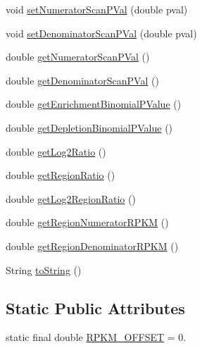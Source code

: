 \begin{DoxyCompactItemize}
void \hyperlink{classumms_1_1core_1_1model_1_1score_1_1_window_all_score_ac9740cfc8bcc63cc0e59c0efc6cde41a}{set\+Numerator\+Scan\+P\+Val} (double pval)
\item 
void \hyperlink{classumms_1_1core_1_1model_1_1score_1_1_window_all_score_ab58a0866736371255e8c3c70c921687e}{set\+Denominator\+Scan\+P\+Val} (double pval)
\item 
double \hyperlink{classumms_1_1core_1_1model_1_1score_1_1_window_all_score_affae49300346f55b174aa8ff6bb32820}{get\+Numerator\+Scan\+P\+Val} ()
\item 
double \hyperlink{classumms_1_1core_1_1model_1_1score_1_1_window_all_score_a8dce98d2a4b85d353527fff26f4f9bf2}{get\+Denominator\+Scan\+P\+Val} ()
\item 
double \hyperlink{classumms_1_1core_1_1model_1_1score_1_1_window_all_score_a6e0eefcb0d6d9a2192030ff5daf093f4}{get\+Enrichment\+Binomial\+P\+Value} ()
\item 
double \hyperlink{classumms_1_1core_1_1model_1_1score_1_1_window_all_score_ad3e4a93c84529f4ff80bffc5f2c0f369}{get\+Depletion\+Binomial\+P\+Value} ()
\item 
double \hyperlink{classumms_1_1core_1_1model_1_1score_1_1_window_all_score_accee1ff27647f8b6865ff770bb82c318}{get\+Log2\+Ratio} ()
\item 
double \hyperlink{classumms_1_1core_1_1model_1_1score_1_1_window_all_score_a0836eff5c3d1631e4c502fe96b8ea068}{get\+Region\+Ratio} ()
\item 
double \hyperlink{classumms_1_1core_1_1model_1_1score_1_1_window_all_score_aad4afe76a5c7e1b09e4a7d4095862483}{get\+Log2\+Region\+Ratio} ()
\item 
double \hyperlink{classumms_1_1core_1_1model_1_1score_1_1_window_all_score_a52d6f602bc5ff6a0df966f204fe93284}{get\+Region\+Numerator\+R\+P\+K\+M} ()
\item 
double \hyperlink{classumms_1_1core_1_1model_1_1score_1_1_window_all_score_a3392c352a23ed36bc60920a66a7d12de}{get\+Region\+Denominator\+R\+P\+K\+M} ()
\item 
String \hyperlink{classumms_1_1core_1_1model_1_1score_1_1_window_all_score_ae16b092f09ab224551a0821363a86a48}{to\+String} ()
\end{DoxyCompactItemize}
\subsection*{Static Public Attributes}
\begin{DoxyCompactItemize}
\item 
static final double \hyperlink{classumms_1_1core_1_1model_1_1score_1_1_window_all_score_a7b84b3ecc3055c94193936e0b529a3fb}{R\+P\+K\+M\+\_\+\+O\+F\+F\+S\+E\+T} = 0.
\end{DoxyCompactItemize}
